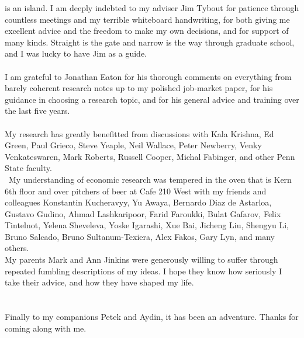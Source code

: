 
 is an island.  I am deeply indebted to my adviser Jim Tybout for patience through countless meetings and my terrible whiteboard handwriting, for both giving me excellent advice and the freedom to make my own decisions, and for support of many kinds.  Straight is the gate and narrow is the way through graduate school, and I was lucky to have Jim as a guide.\\
\vspace{3pt} \\
I am grateful to Jonathan Eaton for his thorough comments on everything from barely coherent research notes up to my polished job-market paper, for his guidance in choosing a research topic, and for his general advice and training over the last five years.\\
\vspace{3pt}\\
My research has greatly benefitted from discussions with Kala Krishna, Ed Green, Paul Grieco, Steve Yeaple, Neil Wallace, Peter Newberry, Venky Venkateswaren, Mark Roberts, Russell Cooper, Michal Fabinger, and other Penn State faculty.\\
\vspace{3pt}\
My understanding of economic research was tempered in the oven that is Kern 6th floor and over pitchers of beer at Cafe 210 West with my friends and colleagues Konstantin Kucheravyy, Yu Awaya, Bernardo Diaz de Astarloa, Gustavo Gudino, Ahmad Lashkaripoor, Farid Faroukki, Bulat Gafarov, Felix Tintelnot, Yelena Sheveleva, Yoske Igarashi, Xue Bai, Jicheng Liu, Shengyu Li, Bruno Salcado, Bruno Sultanum-Texiera, Alex Fakos, Gary Lyn, and many others.
\vspace{3pt}\\
My parents Mark and Ann Jinkins were generously willing to suffer through repeated fumbling descriptions of my ideas.  I hope they know how seriously I take their advice, and how they have shaped my life.\\
\vspace{3pt}\\

\vspace{3pt}\\
Finally to my companions Petek and Aydin, it has been an adventure.  Thanks for coming along with me.
